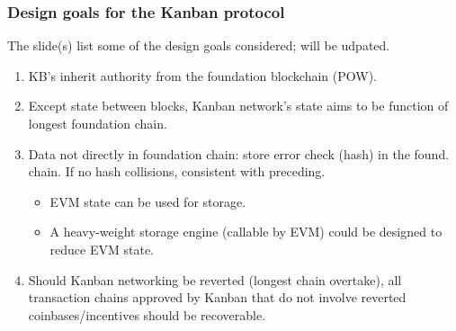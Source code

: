 \begin{frame}
\frametitle{Design goals for the Kanban protocol}
The slide(s) list some of the design goals considered; will be udpated.

\begin{enumerate}
\item KB's inherit authority from the foundation blockchain (POW).
\item \label{itemKanbanIsFunctionOfFoundationChain} Except state between blocks, Kanban network's state aims to be function of longest foundation chain. 
\item Data not directly in foundation chain: store error check (hash) in the found. chain. If no hash collisions, consistent with preceding.
\begin{itemize}
	\item EVM state can be used for storage.
	\item A heavy-weight storage engine (callable by EVM) could be designed to reduce EVM state.
\end{itemize}
\item Should Kanban networking be reverted (longest chain overtake), all transaction chains approved by Kanban that do not involve reverted coinbases/incentives should be recoverable.

\end{enumerate}
\end{frame}
